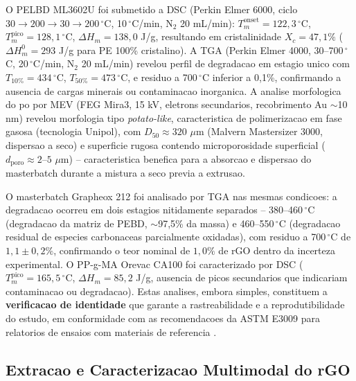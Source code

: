 \documentclass[11pt,a4paper,oneside]{article}
\begin{document}
O PELBD ML3602U foi submetido a DSC (Perkin Elmer 6000, ciclo $30{\rightarrow}200{\rightarrow}
30{\rightarrow}200\,^{\circ}$C, 10$\,^{\circ}$C/min, N$_2$ 20 mL/min): $T_m^{\text{onset}} =
122{,}3\,^{\circ}$C, $T_m^{\text{pico}} = 128{,}1\,^{\circ}$C, $\Delta H_m = 138{,}0$ J/g,
resultando em cristalinidade $X_c = 47{,}1\%$ ($\Delta H_m^0{=}293$ J/g para PE 100\%
cristalino). A TGA (Perkin Elmer 4000, 30--700$\,^{\circ}$C, 20$\,^{\circ}$C/min, N$_2$
20 mL/min) revelou perfil de degradacao em estagio unico com $T_{10\%} = 434\,^{\circ}$C,
$T_{50\%} = 473\,^{\circ}$C, e residuo a 700$\,^{\circ}$C inferior a 0,1\%, confirmando a
ausencia de cargas minerais ou contaminacao inorganica. A analise morfologica do po por MEV
(FEG Mira3, 15 kV, eletrons secundarios, recobrimento Au ${\sim}$10 nm) revelou morfologia tipo
\textit{potato-like}, caracteristica de polimerizacao em fase gasosa (tecnologia Unipol), com
$D_{50} \approx 320$ $\mu$m (Malvern Mastersizer 3000, dispersao a seco) e superficie rugosa
contendo microporosidade superficial ($d_{\text{poro}} \approx 2$--$5$ $\mu$m) -- caracteristica
benefica para a absorcao e dispersao do masterbatch durante a mistura a seco previa a extrusao.

O masterbatch Grapheox 212 foi analisado por TGA nas mesmas condicoes: a degradacao ocorreu em
dois estagios nitidamente separados -- 380--460$\,^{\circ}$C (degradacao da matriz de PEBD,
${\sim}$97,5\% da massa) e 460--550$\,^{\circ}$C (degradacao residual de especies carbonaceas
parcialmente oxidadas), com residuo a 700$\,^{\circ}$C de $1{,}1{\pm}0{,}2\%$, confirmando o teor
nominal de $1{,}0\%$ de rGO dentro da incerteza experimental. O PP-g-MA Orevac CA100 foi
caracterizado por DSC ($T_m^{\text{pico}} = 165{,}5\,^{\circ}$C, $\Delta H_m = 85{,}2$ J/g,
ausencia de picos secundarios que indicariam contaminacao ou degradacao). Estas analises,
embora simples, constituem a {\bfseries verificacao de identidade} que garante a
rastreabilidade e a reprodutibilidade do estudo, em conformidade com as recomendacoes da ASTM
E3009 para relatorios de ensaios com materiais de referencia \cite{Montgomery2020}.

\subsection{Extracao e Caracterizacao Multimodal do rGO}\label{sec:extracao_rgo}
\end{document}
